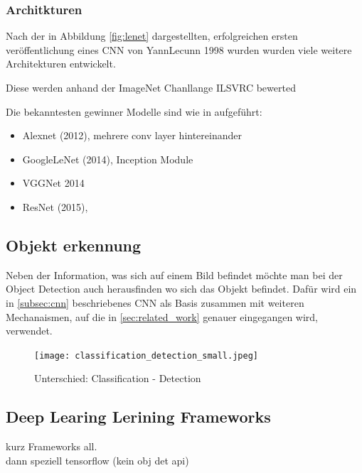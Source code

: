 \subsubsection{Architkturen}\label{subsubsec:architecture}

Nach der in Abbildung \ref{fig:lenet} dargestellten, erfolgreichen
ersten veröffentlichung eines CNN von YannLecunn 1998 \cite{lecunGradientBasedLearningApplied1998}
wurden wurden viele weitere Architekturen entwickelt. 

Diese werden anhand der ImageNet Chanllange ILSVRC \cite{ILSVRC15} bewerted

Die bekanntesten gewinner Modelle sind wie in \cite{StanfordCS231nConvolutional}
aufgeführt:


\begin{itemize}
    \item Alexnet (2012), mehrere conv layer hintereinander
    \item GoogleLeNet (2014), Inception Module
    \item VGGNet 2014
    \item ResNet (2015), 
\end{itemize}

\subsection{Objekt erkennung}\label{subsec:objdet_det}

Neben der Information, was sich auf einem Bild befindet möchte
man bei der Object Detection auch herausfinden wo sich das 
Objekt befindet.
Dafür wird ein in \ref{subsec:cnn} beschriebenes CNN als Basis 
zusammen mit weiteren Mechanaismen, auf die in \ref{sec:related_work}
genauer eingegangen wird, verwendet.
\begin{figure}[htb]
    \centering
    \label{fig:class_vs_det}
    \texttt{[image: classification\_detection\_small.jpeg]}
    \caption{Unterschied: Classification - Detection}
\end{figure}


\subsection{Deep Learing Lerining Frameworks}
kurz Frameworks all.\\
dann speziell tensorflow (kein obj det api)


